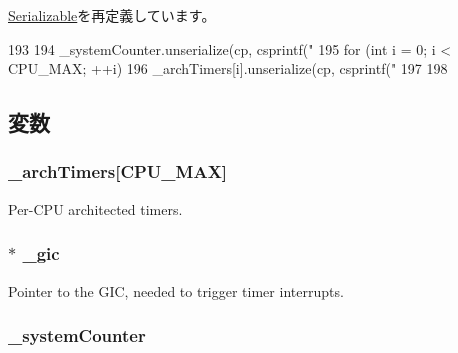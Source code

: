 \hyperlink{classSerializable_af100c4e9feabf3cd918619c88c718387}{Serializable}を再定義しています。


\begin{DoxyCode}
193 {
194     _systemCounter.unserialize(cp, csprintf("%
195     for (int i = 0; i < CPU_MAX; ++i) {
196         _archTimers[i].unserialize(cp, csprintf("%
197     }
198 }
\end{DoxyCode}


\subsection{変数}
\hypertarget{classGenericTimer_af68f66e102b05b60384be22f871c89ec}{
\subsubsection[{\_\-archTimers}]{ {\bf \_\-archTimers}\mbox{[}{\bf CPU\_\-MAX}\mbox{]}}}
\label{classGenericTimer_af68f66e102b05b60384be22f871c89ec}


Per-\/CPU architected timers. \hypertarget{classGenericTimer_a3e5f959a7b42b68c04c24579d7694403}{
\subsubsection[{\_\-gic}]{$\ast$ {\bf \_\-gic}}}
\label{classGenericTimer_a3e5f959a7b42b68c04c24579d7694403}


Pointer to the GIC, needed to trigger timer interrupts. \hypertarget{classGenericTimer_afd7c96638f55784d1c67600fe458440b}{
\subsubsection[{\_\-systemCounter}]{ {\bf \_\-systemCounter}}}
\label{classGenericTimer_afd7c96638f55784d1c67600fe458440b}


